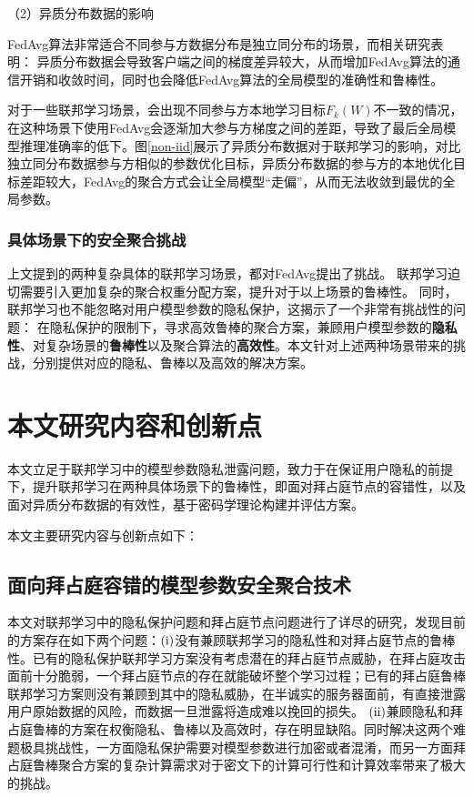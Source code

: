 （2）异质分布数据的影响

FedAvg算法非常适合不同参与方数据分布是独立同分布的场景，而相关研究\cite{zhao2018federated}表明：
异质分布数据会导致客户端之间的梯度差异较大，从而增加FedAvg算法的通信开销和收敛时间，同时也会降低FedAvg算法的全局模型的准确性和鲁棒性。

对于一些联邦学习场景，会出现不同参与方本地学习目标$F_k(W)$不一致的情况，在这种场景下使用FedAvg会逐渐加大参与方梯度之间的差距，导致了最后全局模型推理准确率的低下。图\ref{non-iid}展示了异质分布数据对于联邦学习的影响，对比独立同分布数据参与方相似的参数优化目标，异质分布数据的参与方的本地优化目标差距较大，FedAvg的聚合方式会让全局模型“走偏”，从而无法收敛到最优的全局参数。

\subsubsection{具体场景下的安全聚合挑战}
上文提到的两种复杂具体的联邦学习场景，都对FedAvg提出了挑战。
联邦学习迫切需要引入更加复杂的聚合权重分配方案，提升对于以上场景的鲁棒性。
同时，联邦学习也不能忽略对用户模型参数的隐私保护，这揭示了一个非常有挑战性的问题：
在隐私保护的限制下，寻求高效鲁棒的聚合方案，兼顾用户模型参数的\textbf{隐私性}、对复杂场景的\textbf{鲁棒性}以及聚合算法的\textbf{高效性}。本文针对上述两种场景带来的挑战，分别提供对应的隐私、鲁棒以及高效的解决方案。

\section{本文研究内容和创新点}
本文立足于联邦学习中的模型参数隐私泄露问题，致力于在保证用户隐私的前提下，提升联邦学习在两种具体场景下的鲁棒性，即面对拜占庭节点的容错性，以及面对异质分布数据的有效性，基于密码学理论构建并评估方案。

本文主要研究内容与创新点如下：

\subsection{面向拜占庭容错的模型参数安全聚合技术}
本文对联邦学习中的隐私保护问题和拜占庭节点问题进行了详尽的研究，发现目前的方案存在如下两个问题：$(\rm \romannumeral1)$没有兼顾联邦学习的隐私性和对拜占庭节点的鲁棒性。已有的隐私保护联邦学习方案没有考虑潜在的拜占庭节点威胁，在拜占庭攻击面前十分脆弱，一个拜占庭节点的存在就能破坏整个学习过程；已有的拜占庭鲁棒联邦学习方案则没有兼顾到其中的隐私威胁，在半诚实的服务器面前，有直接泄露用户原始数据的风险，而数据一旦泄露将造成难以挽回的损失。
$(\rm \romannumeral2)$兼顾隐私和拜占庭鲁棒的方案在权衡隐私、鲁棒以及高效时，存在明显缺陷。同时解决这两个难题极具挑战性，一方面隐私保护需要对模型参数进行加密或者混淆，而另一方面拜占庭鲁棒聚合方案的复杂计算需求对于密文下的计算可行性和计算效率带来了极大的挑战。

